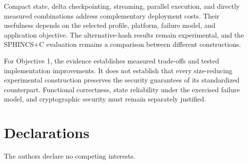 \documentclass[pdflatex,sn-mathphys-num]{sn-jnl}
\begin{document}
Compact state, delta checkpointing, streaming, parallel execution,
and directly measured combinations address complementary deployment
costs. Their usefulness depends on the selected profile, platform,
failure model, and application objective. The alternative-hash results
remain experimental, and the SPHINCS+C evaluation remains a comparison
between different constructions.

For Objective 1, the evidence establishes measured trade-offs and
tested implementation improvements. It does not establish that every
size-reducing experimental construction preserves the security
guarantees of its standardized counterpart. Functional correctness,
state reliability under the exercised failure model, and cryptographic
security must remain separately justified.

\label{sec:conclusion}



\backmatter


\section*{Declarations}


The authors declare no competing interests.





\end{document}
